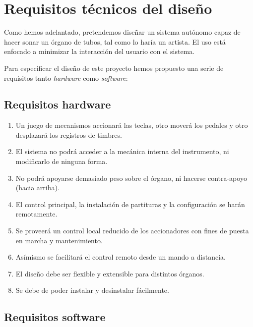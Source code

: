 \chapter{Requisitos técnicos del diseño}
\label{cap:capitulo_2}

Como hemos adelantado, pretendemos diseñar un sistema autónomo capaz de hacer sonar un órgano de tubos, tal como lo haría un artista. El uso está enfocado a minimizar la interacción del usuario con el sistema. 

Para especificar el diseño de este proyecto hemos propuesto una serie de requisitos tanto \textit{hardware} como \textit{software}:

\section{Requisitos hardware}

\begin{enumerate}
	
	\item Un juego de mecanismos accionará las teclas, otro moverá los pedales y otro desplazará los registros de timbres.
	
	\item El sistema no podrá acceder a la mecánica interna del instrumento, ni modificarlo de ninguna forma.
	
	\item No podrá apoyarse demasiado peso sobre el órgano, ni hacerse contra-apoyo (hacia arriba).
	
	\item El control principal, la instalación de partituras y la configuración se harán remotamente.
	
	\item Se proveerá un control local reducido de los accionadores con fines de puesta en marcha y mantenimiento.
	
	\item Asímismo se facilitará el control remoto desde un mando a distancia.
	
	\item El diseño debe ser flexible y extensible para distintos órganos.
	
	\item Se debe de poder instalar y desinstalar fácilmente.
	
\end{enumerate}

\section{Requisitos software}

